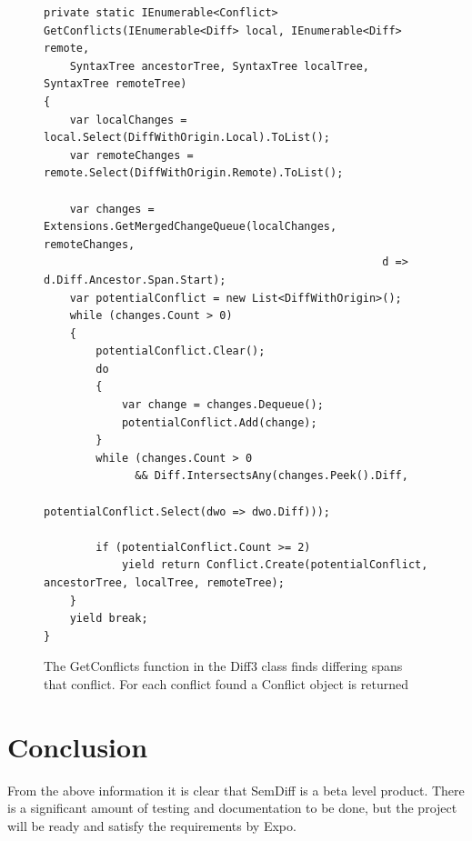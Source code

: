 \documentclass[draftclsnofoot,onecolumn]{IEEEtran}
\begin{document}
\begin{figure}[!t]
\centering
\begin{lstlisting}
private static IEnumerable<Conflict> GetConflicts(IEnumerable<Diff> local, IEnumerable<Diff> remote, 
    SyntaxTree ancestorTree, SyntaxTree localTree, SyntaxTree remoteTree)
{
    var localChanges = local.Select(DiffWithOrigin.Local).ToList();
    var remoteChanges = remote.Select(DiffWithOrigin.Remote).ToList();

    var changes = Extensions.GetMergedChangeQueue(localChanges, remoteChanges, 
                                                    d => d.Diff.Ancestor.Span.Start);
    var potentialConflict = new List<DiffWithOrigin>();
    while (changes.Count > 0)
    {
        potentialConflict.Clear();
        do
        {
            var change = changes.Dequeue();
            potentialConflict.Add(change);
        }
        while (changes.Count > 0 
              && Diff.IntersectsAny(changes.Peek().Diff, 
                                           potentialConflict.Select(dwo => dwo.Diff)));

        if (potentialConflict.Count >= 2)
            yield return Conflict.Create(potentialConflict, ancestorTree, localTree, remoteTree);
    }
    yield break;
}
\end{lstlisting}
\caption{The GetConflicts function in the Diff3 class finds differing 
spans that conflict. For each conflict found a Conflict object is returned}
\label{diff3getconflicts}
\end{figure}







\section{Conclusion}

From the above information it is clear that SemDiff is a beta level product. 
There is a significant amount of testing and documentation to be done, but 
the project will be ready and satisfy the requirements by Expo.
\end{document}
